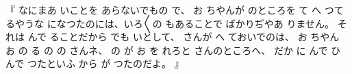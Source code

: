 『
なにまあ
いことを
あらないでもの
で、
お
ちやんが
のところを
て
へ
つて
るやうな
になつたのには、いろ〳〵の
もあることで
ばかりぢやあ
りません。
それは
んで
ることだから
でも
いとして、
さんが
へ
ておいでのは、
お
ちやん
お
の
る
の
の
さんネ、
の
が
お
を
れろと
さんのところへ、
だか
に
んで
ひ
んで
つたといふ
から
が
つたのだよ。
』

